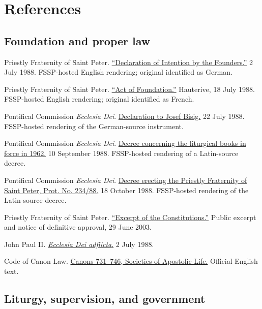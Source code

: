 \section{References}

\subsection{Foundation and proper law}

Priestly Fraternity of Saint Peter. \href{https://www.fssp.org/en/declaration-of-intention-by-the-founders/}{``Declaration of Intention by the Founders.''} 2 July 1988. FSSP-hosted English rendering; original identified as German.

Priestly Fraternity of Saint Peter. \href{https://www.fssp.org/en/act-of-foundation/}{``Act of Foundation.''} Hauterive, 18 July 1988. FSSP-hosted English rendering; original identified as French.

Pontifical Commission \emph{Ecclesia Dei}. \href{https://www.fssp.org/en/declaration-of-the-ecclesia-dei-commission/}{Declaration to Josef Bisig.} 22 July 1988. FSSP-hosted rendering of the German-source instrument.

Pontifical Commission \emph{Ecclesia Dei}. \href{https://www.fssp.org/en/decree-of-the-ecclesia-dei-commission-on-the-liturgical-books-of-1962/}{Decree concerning the liturgical books in force in 1962.} 10 September 1988. FSSP-hosted rendering of a Latin-source decree.

Pontifical Commission \emph{Ecclesia Dei}. \href{https://www.fssp.org/en/decree-erecting-the-priestly-fraternity-of-saint-peter/}{Decree erecting the Priestly Fraternity of Saint Peter, Prot. No. 234/88.} 18 October 1988. FSSP-hosted rendering of the Latin-source decree.

Priestly Fraternity of Saint Peter. \href{https://www.fssp.org/en/excerpt-of-the-constitutions-of-the-priestly-fraternity-of-saint-peter/}{``Excerpt of the Constitutions.''} Public excerpt and notice of definitive approval, 29 June 2003.

John Paul II. \href{https://www.vatican.va/content/john-paul-ii/en/motu_proprio/documents/hf_jp-ii_motu-proprio_02071988_ecclesia-dei.html}{\emph{Ecclesia Dei adflicta}.} 2 July 1988.

Code of Canon Law. \href{https://www.vatican.va/archive/cod-iuris-canonici/eng/documents/cic_lib2-cann731-746_en.html}{Canons 731--746, Societies of Apostolic Life.} Official English text.

\subsection{Liturgy, supervision, and government}

